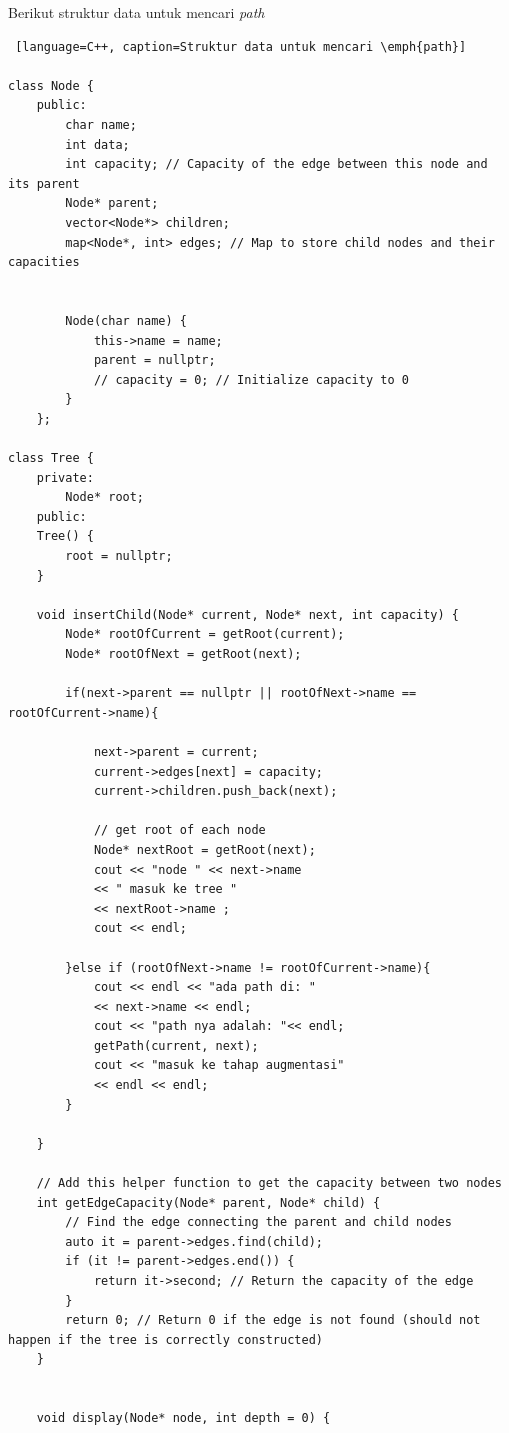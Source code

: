 Berikut struktur data untuk mencari \emph{path}
\begin{lstlisting} [language=C++, caption=Struktur data untuk mencari \emph{path}]

class Node {
    public:
        char name;
        int data;
        int capacity; // Capacity of the edge between this node and its parent
        Node* parent;
        vector<Node*> children;
        map<Node*, int> edges; // Map to store child nodes and their capacities


        Node(char name) {
            this->name = name;
            parent = nullptr;
            // capacity = 0; // Initialize capacity to 0
        }
    };

class Tree {
    private:
        Node* root;
    public:
    Tree() {
        root = nullptr;
    }

    void insertChild(Node* current, Node* next, int capacity) {
        Node* rootOfCurrent = getRoot(current);
        Node* rootOfNext = getRoot(next);

        if(next->parent == nullptr || rootOfNext->name == rootOfCurrent->name){

            next->parent = current;
            current->edges[next] = capacity;
            current->children.push_back(next);

            // get root of each node
            Node* nextRoot = getRoot(next);        
            cout << "node " << next->name 
            << " masuk ke tree " 
            << nextRoot->name ;
            cout << endl;

        }else if (rootOfNext->name != rootOfCurrent->name){
            cout << endl << "ada path di: "
            << next->name << endl;
            cout << "path nya adalah: "<< endl; 
            getPath(current, next);
            cout << "masuk ke tahap augmentasi" 
            << endl << endl;
        }  
        
    }

    // Add this helper function to get the capacity between two nodes
    int getEdgeCapacity(Node* parent, Node* child) {
        // Find the edge connecting the parent and child nodes
        auto it = parent->edges.find(child);
        if (it != parent->edges.end()) {
            return it->second; // Return the capacity of the edge
        }
        return 0; // Return 0 if the edge is not found (should not happen if the tree is correctly constructed)
    }
    

    void display(Node* node, int depth = 0) {


\end{lstlisting}
